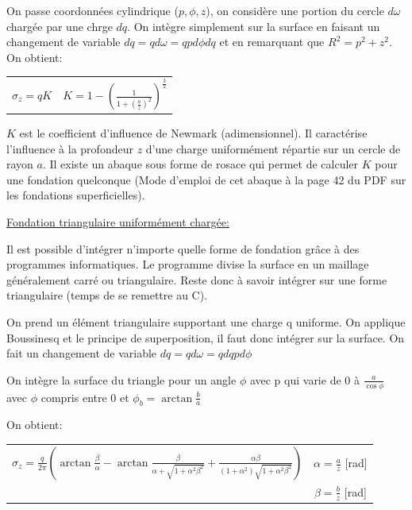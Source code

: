             On passe coordonnées cylindrique ($p, \phi, z$), on considère une portion du cercle $d\omega$ chargée par une chrge $dq$. On intègre simplement sur la surface en faisant un changement de variable $dq = q d\omega = q p d\phi dq$ et en remarquant que $R^2 = p^2 + z^2$. On obtient:
            
            \begin{center}
            \begin{tabular}{c|c}
                 $\sigma_z = q K$ \: \: & $K = 1-(\frac{1}{1+(\frac{a}{z})^2})^{\frac{3}{2}} $
            \end{tabular}
            \end{center} 
            
            $K$ est le coefficient d'influence de Newmark (adimensionnel). Il caractérise l'influence à la profondeur $z$ d'une charge uniformément répartie sur un cercle de rayon $a$. Il existe un abaque sous forme de rosace qui permet de calculer $K$ pour une fondation quelconque (Mode d'emploi de cet abaque à la page 42 du PDF sur les fondations superficielles).
            
            \underline{Fondation triangulaire uniformément chargée:}
            
            Il est possible d'intégrer n'importe quelle forme de fondation grâce à des programmes informatiques. Le programme divise la surface en un maillage généralement carré ou triangulaire. Reste donc à savoir intégrer sur une forme triangulaire (temps de se remettre au C).
            
            On prend un élément triangulaire supportant une charge q uniforme. On applique Boussinesq et le principe de superposition, il faut donc intégrer sur la surface. On fait un changement de variable $dq = q d\omega = q dq p d\phi$
            
            On intègre la surface du triangle pour un angle $\phi$ avec p qui varie de 0 à $\frac{a}{\cos \phi}$ avec $\phi$ compris entre 0 et $\phi_b = \arctan \frac{b}{a}$ 
            
            On obtient:
            
            \begin{center}
            \begin{tabular}{c|c}
                $\sigma_z = \frac{q}{2 \pi}(\arctan \frac{\beta}{\alpha}-\arctan\frac{\beta}{\alpha+ \sqrt{1+\alpha^2\beta^2}}+\frac{\alpha\beta}{(1+\alpha^2)\sqrt{1+\alpha^2\beta^2}})$ \: \:
                    &  $\alpha = \frac{a}{z}$ [rad] \\
                    &  $\beta = \frac{b}{z}$ [rad]  
            \end{tabular}
            \end{center} 
            
